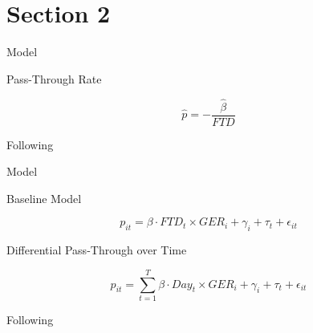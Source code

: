 \section{Section 2}






\begin{frame}{Model}


\vspace{-0.7cm}



\begin{block}{Pass-Through Rate}

\begin{equation}
\label{eq:Pass_Through_Rate}
\hat{p} = - \frac{\hat{\beta}}{FTD} 
\end{equation}

\end{block}



Following \textcite{Frondel2024}

\end{frame}






\begin{frame}{Model}

\vspace{-0.7cm}

\begin{block}{Baseline Model}

\begin{equation}
\label{eq:Base_DiD}
p_{it} = \beta \cdot FTD_{t} \times GER_{i} + \gamma_{i} + \tau_{t} + \epsilon_{it}
\end{equation}

\end{block}




\begin{block}{Differential Pass-Through over Time}

\begin{equation}
\label{eq:Diff_DiD}
p_{it} = \sum_{t=1}^{T} \beta \cdot Day_{t} \times GER_{i} + \gamma_{i} + \tau_{t} + \epsilon_{it}
\end{equation}

\end{block}




Following \textcite{Frondel2024}



\end{frame}


